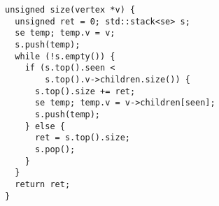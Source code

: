 \documentclass{beamer}
\begin{document}
\begin{frame}[fragile]
  \begin{lstlisting}
unsigned size(vertex *v) {
  unsigned ret = 0; std::stack<se> s;
  se temp; temp.v = v; 
  s.push(temp);
  while (!s.empty()) {
    if (s.top().seen < 
        s.top().v->children.size()) {
      s.top().size += ret;
      se temp; temp.v = v->children[seen]; 
      s.push(temp);
    } else {
      ret = s.top().size;
      s.pop();
    }
  }
  return ret;
}
  \end{lstlisting}
\end{frame}
\end{document}
